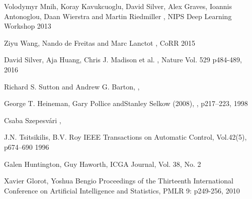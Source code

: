 \documentclass[twocolumn]{phdsymp} %
\begin{document}
\begin{thebibliography}{1}
Volodymyr Mnih, Koray Kavukcuoglu, David Silver, Alex Graves, Ioannis Antonoglou, Daan Wierstra and Martin Riedmiller
,
\newblock NIPS Deep Learning Workshop 2013

Ziyu Wang, Nando de Freitas and Marc Lanctot
,
\newblock CoRR 2015

David Silver, Aja Huang, Chris J. Madison et al.
,
\newblock Nature Vol. 529 p484-489, 2016


Richard S. Sutton and Andrew G. Barton,
,

George T. Heineman, Gary Pollice andStanley Selkow (2008),
,
\newblock p217–223, 1998

Csaba Szepesv{\'a}ri
,

J.N. Tsitsikilis, B.V. Roy 
\newblock IEEE Transactions on Automatic Control, Vol.42(5), p674–690 1996

Galen Huntington, Guy Haworth, 
\newblock ICGA Journal, Vol. 38, No. 2

Xavier Glorot, Yoshua Bengio
\newblock Proceedings of the Thirteenth International Conference on Artificial Intelligence and Statistics, PMLR 9: p249-256, 2010

\end{thebibliography}
%
\end{document}
